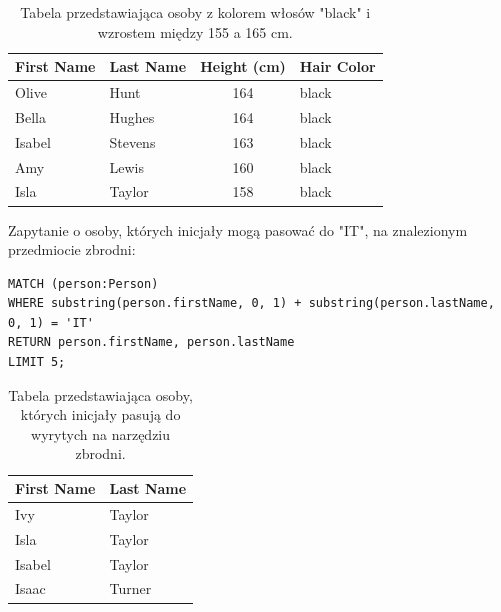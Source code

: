 \documentclass[a4paper,12pt]{article}
\begin{document}
\begin{table}[h!]
\centering
\begin{tabular}{|l|l|c|l|}
\hline
\textbf{First Name} & \textbf{Last Name} & \textbf{Height (cm)} & \textbf{Hair Color} \\ \hline
Olive              & Hunt               & 164                  & black               \\ \hline
Bella              & Hughes             & 164                  & black               \\ \hline
Isabel             & Stevens            & 163                  & black               \\ \hline
Amy                & Lewis              & 160                  & black               \\ \hline
Isla               & Taylor             & 158                  & black               \\ \hline
\end{tabular}
\caption{Tabela przedstawiająca osoby z kolorem włosów "black" i wzrostem między 155 a 165 cm.}
\label{tab:black_hair_height}
\end{table}

Zapytanie o osoby, których inicjały mogą pasować do "IT", na znalezionym przedmiocie zbrodni:

\begin{center}
\begin{minipage}{0.8\linewidth}
\begin{lstlisting}[language=Cypher, basicstyle=\small, breaklines=true]
MATCH (person:Person)
WHERE substring(person.firstName, 0, 1) + substring(person.lastName, 0, 1) = 'IT'
RETURN person.firstName, person.lastName
LIMIT 5;
\end{lstlisting}
\end{minipage}
\end{center}

\begin{table}[h!]
\centering
\begin{tabular}{|l|l|}
\hline
\textbf{First Name} & \textbf{Last Name} \\ \hline
Ivy                & Taylor             \\ \hline
Isla               & Taylor             \\ \hline
Isabel             & Taylor             \\ \hline
Isaac              & Turner             \\ \hline
\end{tabular}
\caption{Tabela przedstawiająca osoby, których inicjały pasują do wyrytych na narzędziu zbrodni.}
\label{tab:names}
\end{table}
\newpage
\end{document}
